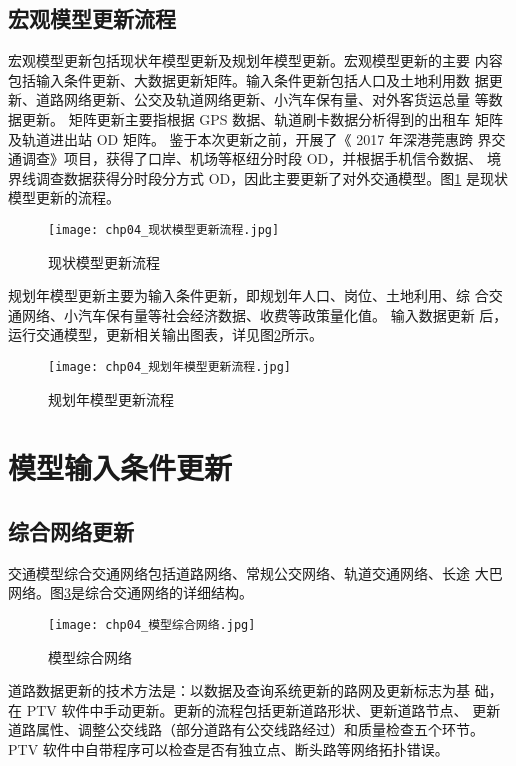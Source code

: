 \subsection{宏观模型更新流程}
宏观模型更新包括现状年模型更新及规划年模型更新。宏观模型更新的主要
内容包括输入条件更新、大数据更新矩阵。输入条件更新包括人口及土地利用数
据更新、道路网络更新、公交及轨道网络更新、小汽车保有量、对外客货运总量
等数据更新。 矩阵更新主要指根据 GPS 数据、轨道刷卡数据分析得到的出租车
矩阵及轨道进出站 OD 矩阵。 鉴于本次更新之前，开展了《 2017 年深港莞惠跨
界交通调查》项目，获得了口岸、机场等枢纽分时段 OD，并根据手机信令数据、
境界线调查数据获得分时段分方式 OD，因此主要更新了对外交通模型。图\ref{fig:chp04_现状模型更新流程}
是现状模型更新的流程。

\begin{figure}[ht]
  \centering
  \texttt{[image: chp04\_现状模型更新流程.jpg]}
  \caption{现状模型更新流程\label{fig:chp04_现状模型更新流程} }
\end{figure}

规划年模型更新主要为输入条件更新，即规划年人口、岗位、土地利用、综
合交通网络、小汽车保有量等社会经济数据、收费等政策量化值。 输入数据更新
后，运行交通模型，更新相关输出图表，详见图\ref{fig:chp04_规划年模型更新流程}所示。

\begin{figure}[ht]
  \centering
  \texttt{[image: chp04\_规划年模型更新流程.jpg]}
  \caption{规划年模型更新流程\label{fig:chp04_规划年模型更新流程} }
\end{figure}

\section{模型输入条件更新}
\subsection{综合网络更新}
交通模型综合交通网络包括道路网络、常规公交网络、轨道交通网络、长途
大巴网络。图\ref{fig:chp04_模型综合网络}是综合交通网络的详细结构。

\begin{figure}[ht]
  \centering
  \texttt{[image: chp04\_模型综合网络.jpg]}
  \caption{模型综合网络\label{fig:chp04_模型综合网络} }
\end{figure}

道路数据更新的技术方法是：以数据及查询系统更新的路网及更新标志为基
础，在 PTV 软件中手动更新。更新的流程包括更新道路形状、更新道路节点、
更新道路属性、调整公交线路（部分道路有公交线路经过）和质量检查五个环节。
PTV 软件中自带程序可以检查是否有独立点、断头路等网络拓扑错误。

